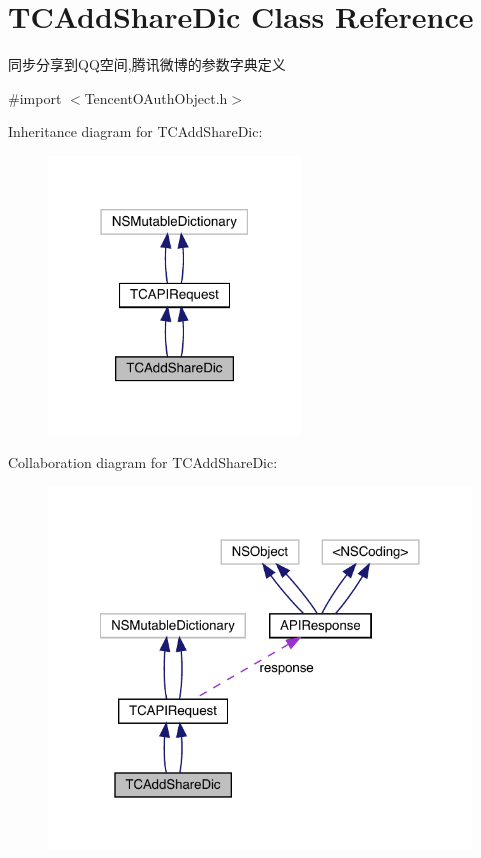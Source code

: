 \hypertarget{interface_t_c_add_share_dic}{}\section{T\+C\+Add\+Share\+Dic Class Reference}
\label{interface_t_c_add_share_dic}


同步分享到\+Q\+Q空间,腾讯微博的参数字典定义  




{\ttfamily \#import $<$Tencent\+O\+Auth\+Object.\+h$>$}



Inheritance diagram for T\+C\+Add\+Share\+Dic\+:\nopagebreak
\begin{figure}[H]
\begin{center}
\leavevmode
\includegraphics[width=190pt]{interface_t_c_add_share_dic__inherit__graph}
\end{center}
\end{figure}


Collaboration diagram for T\+C\+Add\+Share\+Dic\+:\nopagebreak
\begin{figure}[H]
\begin{center}
\leavevmode
\includegraphics[width=322pt]{interface_t_c_add_share_dic__coll__graph}
\end{center}
\end{figure}
